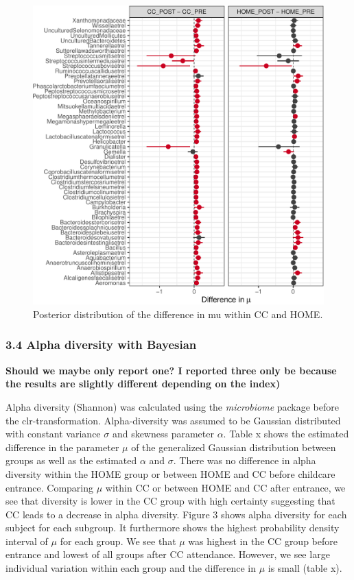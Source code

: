 \documentclass[,man]{apa6}
\begin{document}
\begin{figure}
\centering
\includegraphics{index_files/figure-latex/unnamed-chunk-12-1.pdf}
\caption{\label{fig:unnamed-chunk-12}Posterior distribution of the
difference in mu within CC and HOME.}
\end{figure}

\subsubsection{3.4 Alpha diversity with
Bayesian}\label{alpha-diversity-with-bayesian}

\textbf{Should we maybe only report one? I reported three only be
because the results are slightly different depending on the index)}

Alpha diversity (Shannon) was calculated using the \emph{microbiome}
package before the clr-transformation. Alpha-diversity was assumed to be
Gaussian distributed with constant variance \(\sigma\) and skewness
parameter \(\alpha\). Table x shows the estimated difference in the
parameter \(\mu\) of the generalized Gaussian distribution between
groups as well as the estimated \(\alpha\) and \(\sigma\). There was no
difference in alpha diversity within the HOME group or between HOME and
CC before childcare entrance. Comparing \(\mu\) within CC or between
HOME and CC after entrance, we see that diversity is lower in the CC
group with high certainty suggesting that CC leads to a decrease in
alpha diversity. Figure 3 shows alpha diversity for each subject for
each subgroup. It furthermore shows the highest probability density
interval of \(\mu\) for each group. We see that \(\mu\) was highest in
the CC group before entrance and lowest of all groups after CC
attendance. However, we see large individual variation within each group
and the difference in \(\mu\) is small (table x).
\end{document}
